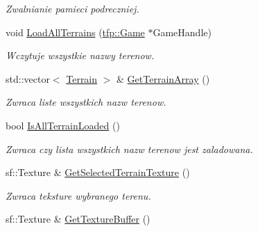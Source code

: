 \begin{DoxyCompactItemize}
\begin{DoxyCompactList}\small\item\em Zwalnianie pamieci podreczniej. \end{DoxyCompactList}\item 
void \mbox{\hyperlink{classtfp_1_1_terrain_list_class_ae1fb1543a71f4e9fb7aa54ad25adcda4}{Load\+All\+Terrains}} (\mbox{\hyperlink{classtfp_1_1_game}{tfp\+::\+Game}} $\ast$Game\+Handle)
\begin{DoxyCompactList}\small\item\em Wczytuje wszystkie nazwy terenow. \end{DoxyCompactList}\item 
\mbox{\label{classtfp_1_1_terrain_list_class_a94ed3d8d4395ab0fdc44244a136d05eb}} 
std\+::vector$<$ \mbox{\hyperlink{structtfp_1_1_terrain}{Terrain}} $>$ \& \mbox{\hyperlink{classtfp_1_1_terrain_list_class_a94ed3d8d4395ab0fdc44244a136d05eb}{Get\+Terrain\+Array}} ()
\begin{DoxyCompactList}\small\item\em Zwraca liste wszystkich nazw terenow. \end{DoxyCompactList}\item 
\mbox{\label{classtfp_1_1_terrain_list_class_a41a638fb2e355abe6a3c885de21eb49f}} 
bool \mbox{\hyperlink{classtfp_1_1_terrain_list_class_a41a638fb2e355abe6a3c885de21eb49f}{Is\+All\+Terrain\+Loaded}} ()
\begin{DoxyCompactList}\small\item\em Zwraca czy lista wszystkich nazw terenow jest zaladowana. \end{DoxyCompactList}\item 
\mbox{\label{classtfp_1_1_terrain_list_class_acff36a6ea4038f58771550167a7c1731}} 
sf\+::\+Texture \& \mbox{\hyperlink{classtfp_1_1_terrain_list_class_acff36a6ea4038f58771550167a7c1731}{Get\+Selected\+Terrain\+Texture}} ()
\begin{DoxyCompactList}\small\item\em Zwraca teksture wybranego terenu. \end{DoxyCompactList}\item 
\mbox{\label{classtfp_1_1_terrain_list_class_a29fb89a8375cfe20e4c0bfac9b9b3cdd}} 
sf\+::\+Texture \& \mbox{\hyperlink{classtfp_1_1_terrain_list_class_a29fb89a8375cfe20e4c0bfac9b9b3cdd}{Get\+Texture\+Buffer}} ()

\end{DoxyCompactItemize}
